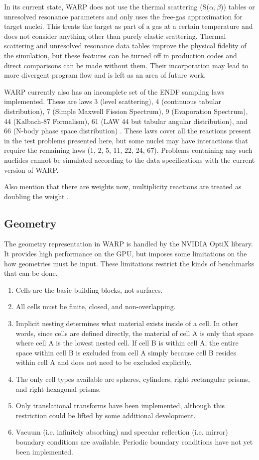 \documentclass[preprint,12pt]{elsarticle}
\begin{document}
In its current state, WARP does not use the thermal scattering (S($\alpha,$$\beta$)) tables or unresolved resonance parameters and only uses the free-gas approximation for target nuclei.  This treats the target as part of a gas at a certain temperature and does not consider anything other than purely elastic scattering. Thermal scattering and unresolved resonance data tables improve the physical fidelity of the simulation, but these features can be turned off in production codes and direct comparisons can be made without them.  Their incorporation may lead to more divergent program flow and is left as an area of future work.

WARP currently also has an incomplete set of the ENDF sampling laws implemented.   These are laws 3 (level scattering), 4 (continuous tabular distribution), 7 (Simple Maxwell Fission Spectrum), 9 (Evaporation Spectrum), 44 (Kalbach-87 Formalism), 61 (LAW 44 but tabular angular distribution), and 66 (N-body phase space distribution) \cite{MCNP}.  These laws cover all the reactions present in the test problems presented here, but some nuclei may have interactions that require the remaining laws (1, 2, 5, 11, 22, 24, 67). Problems containing any such nuclides cannot be simulated according to the data specifications with the current version of WARP.

Also mention that there are weights now, multiplicity reactions are treated as doubling the weight \cite{openmc}.  


\subsection{Geometry}

The geometry representation in WARP is handled by the NVIDIA OptiX library.  It provides high performance on the GPU, but imposes some limitations on the how geometries must be input.  These limitations restrict the kinds of benchmarks that can be done.

\begin{enumerate}
\item Cells are the basic building blocks, not surfaces.
\item All cells must be finite, closed, and non-overlapping.
\item Implicit nesting determines what material exists inside of a cell.  In other words, since cells are defined directly, the material of cell A is only that space where cell A is the lowest nested cell.  If cell B is within cell A, the entire space within cell B is excluded from cell A simply because cell B resides within cell A and does not need to be excluded explicitly.
\item The only cell types available are spheres, cylinders, right rectangular prisms, and right hexagonal prisms.
\item Only translational transforms have been implemented, although this restriction could be lifted by some additional development.
\item Vacuum (i.e. infinitely absorbing) and specular reflection  (i.e. mirror) boundary conditions are available.  Periodic boundary conditions have not yet been implemented.
\end{enumerate}
\end{document}
